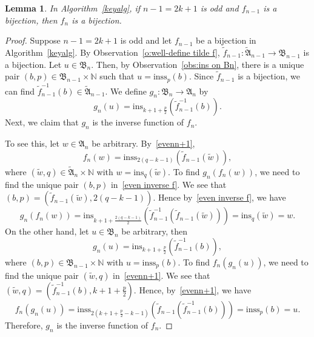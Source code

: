 \documentclass[12pt]{amsart}
\newtheorem{lem}[thm]{Lemma}
\theoremstyle{definition}
\numberwithin{equation}{section}
\newcommand{\ins}[1]{\mathrm{ins}_{#1}}
\newcommand{\inss}[1]{\mathrm{inss}_{#1}}
\begin{document}
\begin{lem}\label{l:odd to even}
    In Algorithm~\ref{keyalg}, if $n-1=2k+1$ is odd and $f_{n-1}$ is a bijection, then $f_{n}$ is a bijection.
\end{lem}
\begin{proof}
Suppose $n-1=2k+1$ is odd and let $f_{n-1}$ be a bijection in Algorithm~\ref{keyalg}. By Observation~\ref{o:well-define tilde f}, $\tilde{f}_{n-1}: \tilde{\mathfrak A}_{n-1} \rightarrow \mathfrak B_{n-1}$ is a bijection. Let $u \in \mathfrak B_n$. Then, by Observation~\ref{obs:ins on Bn}, there is a unique pair $(b,p) \in \mathfrak B_{n-1} \times \mathbb N$ such that $u = \inss p (b)$. Since $\tilde{f}_{n-1}$ is a bijection, we can find $\tilde{f}_{n-1}^{-1}(b) \in \tilde{\mathfrak A}_{n-1}$. We define $g_n: \mathfrak B_n \rightarrow \mathfrak A_n$ by \begin{equation}\label{even inverse f}
    g_n(u) = \ins{k+1+\frac{p}{2}}(\tilde{f}_{n-1}^{-1}(b)).
\end{equation}Next, we claim that $g_n$ is the inverse function of $f_n$.

To see this, let $w\in \mathfrak A_n$ be arbitrary. By~\eqref{evenn+1}, \begin{equation*}
    f_n(w) = \inss{2(q-k-1)}(\tilde{f}_{n-1}(\tilde{w})),
\end{equation*}where $(\tilde{w},q)\in \tilde{\mathfrak A}_n \times \mathbb N$ with $w = \ins{q} (\tilde{w})$. To find $g_n(f_n(w))$, we need to find the unique pair $(b,p)$ in~\eqref{even inverse f}. We see that $(b,p) =(\tilde{f}_{n-1}(\tilde{w}),2(q-k-1))$. Hence by~\eqref{even inverse f}, we have
\begin{equation*}
    g_n(f_n(w)) = \ins{k+1+\frac{2(q-k-1)}{2}}(\tilde{f}_{n-1}^{-1}(\tilde{f}_{n-1}(\tilde{w}))) = \ins{q} (\tilde{w}) = w.
\end{equation*}
On the other hand, let $u \in \mathfrak B_n$ be arbitrary, then \begin{equation*}
    g_n(u) = \ins{k+1+\frac{p}{2}}(\tilde{f}_{n-1}^{-1}(b)),
\end{equation*}where $(b,p) \in \mathfrak B_{n-1} \times \mathbb N$ with $u=\inss p (b)$. To find $f_n(g_n(u))$, we need to find the unique pair $(\tilde{w},q)$ in~\eqref{evenn+1}. We see that $(\tilde{w},q) = (\tilde{f}_{n-1}^{-1}(b),k+1+\frac{p}{2})$. Hence, by~\eqref{evenn+1}, we have
\begin{equation*}
    f_n(g_n(u)) = \inss{2(k+1+\frac{p}{2} -k -1)}(\tilde{f}_{n-1}(\tilde{f}_{n-1}^{-1}(b))) = \inss{p}(b) = u.
\end{equation*}
Therefore, $g_n$ is the inverse function of $f_n$.
\end{proof}
\end{document}
